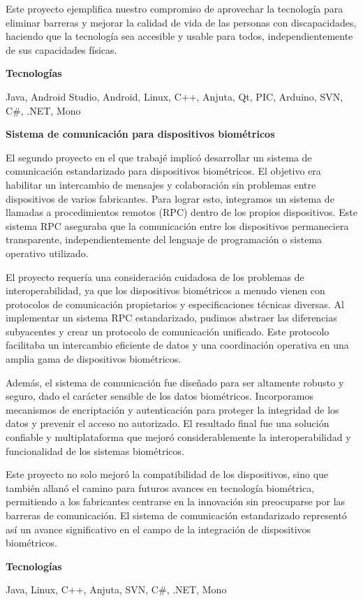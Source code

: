 \documentclass[a4paper,10pt]{article}
\newcommand{\cvsubsubsection}[1]{
\begin{tcolorbox}[colback=gray!10, colframe=gray!10, boxrule=0pt, arc=0mm, outer arc=0mm, width=\textwidth, boxsep=0pt, left=4mm, right=4mm, top=1mm, bottom=1mm]
  \textbf{#1}
\end{tcolorbox}
\vspace{1mm}
}
\newcommand{\cvsubsubsubsection}[1]{
  \begin{tcolorbox}[colback=gray!5, colframe=gray!5, boxrule=0pt, arc=0mm, outer arc=0mm, width=\textwidth, boxsep=0pt, left=6mm, right=6mm, top=1mm, bottom=1mm]
    \textbf{#1}
  \end{tcolorbox}
  \vspace{1mm}
}
\begin{document}
Este proyecto ejemplifica nuestro compromiso de aprovechar la tecnología para eliminar barreras y mejorar la calidad de vida de las personas con discapacidades, haciendo que la tecnología sea accesible y usable para todos, independientemente de sus capacidades físicas.

\cvsubsubsubsection{Tecnologías}
Java, Android Studio, Android, Linux, C++, Anjuta, Qt, PIC, Arduino, SVN, C\#, .NET, Mono

\cvsubsubsection{Sistema de comunicación para dispositivos biométricos}
El segundo proyecto en el que trabajé implicó desarrollar un sistema de comunicación estandarizado para dispositivos biométricos. El objetivo era habilitar un intercambio de mensajes y colaboración sin problemas entre dispositivos de varios fabricantes. Para lograr esto, integramos un sistema de llamadas a procedimientos remotos (RPC) dentro de los propios dispositivos. Este sistema RPC aseguraba que la comunicación entre los dispositivos permaneciera transparente, independientemente del lenguaje de programación o sistema operativo utilizado.

El proyecto requería una consideración cuidadosa de los problemas de interoperabilidad, ya que los dispositivos biométricos a menudo vienen con protocolos de comunicación propietarios y especificaciones técnicas diversas. Al implementar un sistema RPC estandarizado, pudimos abstraer las diferencias subyacentes y crear un protocolo de comunicación unificado. Este protocolo facilitaba un intercambio eficiente de datos y una coordinación operativa en una amplia gama de dispositivos biométricos.

Además, el sistema de comunicación fue diseñado para ser altamente robusto y seguro, dado el carácter sensible de los datos biométricos. Incorporamos mecanismos de encriptación y autenticación para proteger la integridad de los datos y prevenir el acceso no autorizado. El resultado final fue una solución confiable y multiplataforma que mejoró considerablemente la interoperabilidad y funcionalidad de los sistemas biométricos.

Este proyecto no solo mejoró la compatibilidad de los dispositivos, sino que también allanó el camino para futuros avances en tecnología biométrica, permitiendo a los fabricantes centrarse en la innovación sin preocuparse por las barreras de comunicación. El sistema de comunicación estandarizado representó así un avance significativo en el campo de la integración de dispositivos biométricos.

\cvsubsubsubsection{Tecnologías}
Java, Linux, C++, Anjuta, SVN, C\#, .NET, Mono
\end{document}
